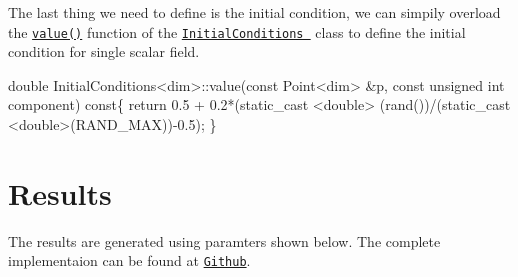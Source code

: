  The last thing we need to define is the initial condition, we can simpily overload the \href{../html/class_initial_conditions.html#a369cea7ba74f8cd0a6ca12e0c164ff74}{\tt value()} function of the \href{../html/class_initial_conditions.html}{\tt Initial\-Conditions } class to define the initial condition for single scalar field. 
\begin{DoxyCode}
\textcolor{keywordtype}{double} InitialConditions<dim>::value(\textcolor{keyword}{const} Point<dim>   &p, \textcolor{keyword}{const} \textcolor{keywordtype}{unsigned} \textcolor{keywordtype}{int}  component)\textcolor{keyword}{ const}\{
  \textcolor{keywordflow}{return} 0.5 + 0.2*(static\_cast <\textcolor{keywordtype}{double}> (rand())/(static\_cast <double>(RAND\_MAX))-0.5); 
\}
\end{DoxyCode}
\hypertarget{growth_results}{}\section{Results}\label{growth_results}
 

The results are generated using paramters shown below. The complete implementaion can be found at \href{https://github.com/mechanoChem/mechanoChemFEM/tree/example/Example3_Allen-Cahn}{\tt Github}.


